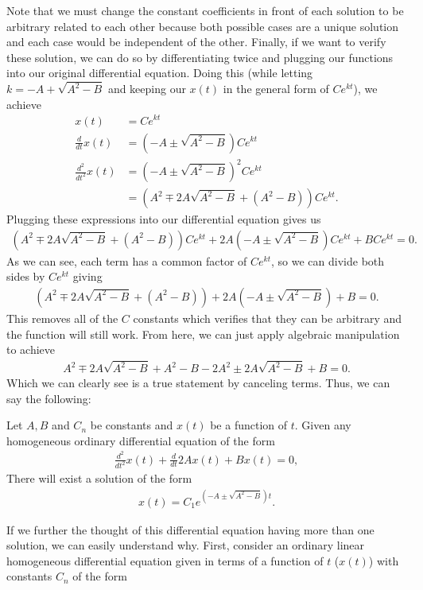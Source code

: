 Note that we must change the constant coefficients in front of each solution to be arbitrary related to each other because both possible cases are a unique solution and each case would be independent of the other. Finally, if we want to verify these solution, we can do so by differentiating twice and plugging our functions into our original differential equation. Doing this (while letting $k=-A+\sqrt{A^2-B}$ and keeping our $x(t)$ in the general form of $Ce^{kt}$), we achieve
\begin{align}
x(t)&=Ce^{kt} \\
\frac{d}{dt}x(t)&=(-A\pm\sqrt{A^2-B})Ce^{kt} \\
\frac{d^2}{dt^2}x(t)&=(-A\pm\sqrt{A^2-B})^2Ce^{kt} \\
&= (A^2\mp2A\sqrt{A^2-B}+(A^2-B))Ce^{kt}.
\end{align}
Plugging these expressions into our differential equation gives us
\begin{align}
(A^2\mp2A\sqrt{A^2-B}+(A^2-B))Ce^{kt}+2A(-A\pm\sqrt{A^2-B})Ce^{kt}+BCe^{kt}=0.
\end{align}
As we can see, each term has a common factor of $Ce^{kt}$, so we can divide both sides by $Ce^{kt}$ giving
\begin{align}
(A^2\mp2A\sqrt{A^2-B}+(A^2-B))+2A(-A\pm\sqrt{A^2-B})+B=0.
\end{align}
This removes all of the $C$ constants which verifies that they can be arbitrary and the function will still work. From here, we can just apply algebraic manipulation to achieve
\begin{align}
A^2\mp 2A\sqrt{A^2-B}+A^2-B-2A^2\pm2A\sqrt{A^2-B}+B=0.
\end{align}
Which we can clearly see is a true statement by canceling terms. Thus, we can say the following:
\begin{theo}{}
	Let $A,B$ and $C_n$ be constants and $x(t)$ be a function of $t$. Given any homogeneous ordinary differential equation of the form
	\begin{align*}
	\frac{d^2}{dt^2}x(t)+\frac{d}{dt}2Ax(t)+Bx(t)=0,
	\end{align*}
	There will exist a solution of the form
	\begin{align*}
	x(t)=C_1e^{(-A\pm\sqrt{A^2-B})t}.
	\end{align*}
\end{theo}
If we further the thought of this differential equation having more than one solution, we can easily understand why. First, consider an ordinary linear homogeneous differential equation given in terms of a function of $t$ ($x(t)$) with constants $C_n$ of the form
